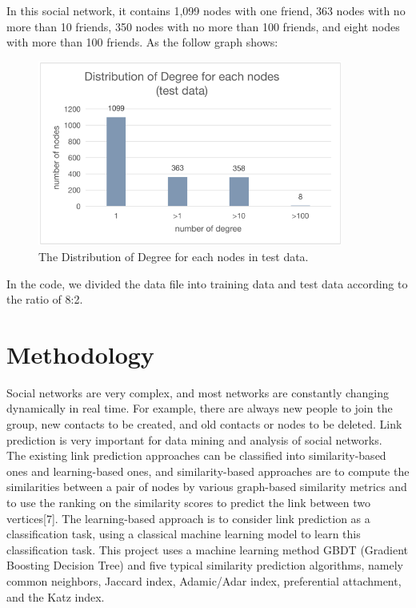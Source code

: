 \documentclass{article}
\begin{document}
In this social network, it contains 1,099 nodes with one friend, 363 nodes with no more than 10 friends, 350 nodes with no more than 100 friends, and eight nodes with more than 100 friends. As the follow graph shows:
\\

\begin{figure}[h!]
	\includegraphics[width=10cm]{images/test_distri.png}
	\centering
	\caption{The Distribution of Degree for each nodes in test data.}\label{test}
\end{figure}

In the code, we divided the data file into training data and test data according to the ratio of 8:2.\\

\section{Methodology}
Social networks are very complex, and most networks are constantly changing dynamically in real time. For example, there are always new people to join the group, new contacts to be created, and old contacts or nodes to be deleted. Link prediction is very important for data mining and analysis of social networks.\\

The existing link prediction approaches can be classified into similarity-based ones and learning-based ones, and similarity-based approaches are to compute the similarities between a pair of nodes by various graph-based similarity metrics and to use the ranking on the similarity scores to predict the link between two vertices[7]. The learning-based approach is to consider link prediction as a classification task, using a classical machine learning model to learn this classification task. This project uses a machine learning method GBDT (Gradient Boosting Decision Tree) and five typical similarity prediction algorithms, namely common neighbors, Jaccard index,  Adamic/Adar index, preferential attachment, and the Katz index.\\
\end{document}
